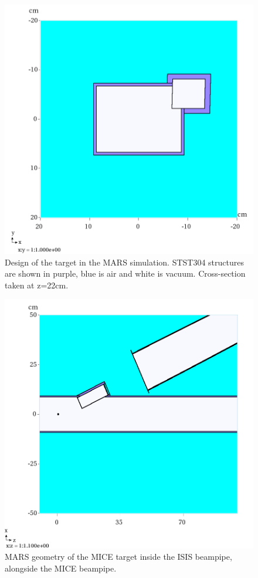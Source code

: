 \documentclass[a4paper,11pt]{article}
\begin{document}
\begin{figure}[t!]
  \begin{center}
    \includegraphics[width=0.62\columnwidth]{./figures/XYGeom-v6-Q1-z=22cm.png}
    \caption{Design of the target in the MARS simulation. STST304 structures are shown in purple, blue is air and white is vacuum. Cross-section taken at z=22cm.} 
    \label{fig:MARSXY}
  \end{center}
\end{figure}

\begin{figure}[t!]
  \begin{center}
    \includegraphics[width=0.62\columnwidth]{./figures/XZGeom-v6-Q1-y=6cm.png}
    \caption{MARS geometry of the MICE target inside the ISIS beampipe, alongside the MICE beampipe. }
    \label{fig:MARSXZ}
  \end{center}
\end{figure}

\pagebreak
\end{document}
